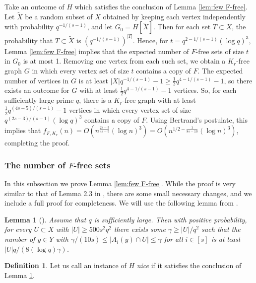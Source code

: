 \documentclass[11pt]{article}
\let\oldendproof\endproof
\renewenvironment{proof}[1][\proofname]{\oldproof[\bf #1]}{\oldendproof}
\theoremstyle{plain}
\newtheorem{lemma}[theorem]{Lemma}
\theoremstyle{definition}
\newtheorem{definition}[theorem]{Definition}
\begin{document}
\begin{proof}[Proof of Theorem \ref{thm:cliquefree vs clique precise}]
    Take an outcome of $H$ which satisfies the conclusion of Lemma \ref{lem:few F-free}. Let $\tilde{X}$ be a random subset of $X$ obtained by keeping each vertex independently with probability $q^{-1/(s-1)}$, and let $G_0=H[\tilde{X}]$. Then for each set $T\subset X$, the probability that $T\subset \tilde{X}$ is $(q^{-1/(s-1)})^{|T|}$. Hence, for $t=q^{2-1/(s-1)}(\log q)^{3}$, Lemma \ref{lem:few F-free} implies that the expected number of $F$-free sets of size $t$ in $G_0$ is at most 1. Removing one vertex from each such set, we obtain a $K_r$-free graph $G$ in which every vertex set of size $t$ contains a copy of $F$. The expected number of vertices in $G$ is at least $|X|q^{-1/(s-1)}-1\geq \frac{1}{2}q^{4-1/(s-1)}-1$, so there exists an outcome for $G$ with at least $\frac{1}{2}q^{4-1/(s-1)}-1$ vertices. So, for each sufficiently large prime $q$, there is a $K_r$-free graph with at least $\frac{1}{2}q^{(4s-5)/(s-1)}-1$ vertices in which every vertex set of size $q^{(2s-3)/(s-1)}(\log q)^{3}$ contains a copy of $F$. Using Bertrand's postulate, this implies that $f_{F,K_r}(n)=O(n^{\frac{2s-3}{4s-5}}(\log n)^{3})=O(n^{1/2-\frac{1}{8s-10}}(\log n)^3)$, completing the proof.
\end{proof}

\subsubsection{The number of $F$-free sets} \label{sec:Ffree sets}

In this subsection we prove Lemma \ref{lem:few F-free}. While the proof is very similar to that of Lemma 2.3 in \cite{Janzer_Sudakov}, there are some small necessary changes, and we include a full proof for completeness. We will use the following lemma from \cite{Janzer_Sudakov}.

\begin{lemma}[{\cite[Lemma 2.4]{Janzer_Sudakov}}] \label{lem:thereisgoodscale}
    Assume that $q$ is sufficiently large. Then with positive probability, for every $U\subset X$ with $|U|\geq 500s^2q^2$ there exists some $\gamma\geq |U|/q^2$ such that the number of $y\in Y$ with $\gamma/(10s)\leq|A_i(y)\cap U|\leq \gamma$ for all $i\in [s]$ is at least $|U|q/(8(\log q)\gamma)$.
\end{lemma}

\begin{definition}
    Let us call an instance of $H$ \emph{nice} if it satisfies the conclusion of Lemma \ref{lem:thereisgoodscale}.
\end{definition}
\end{document}
